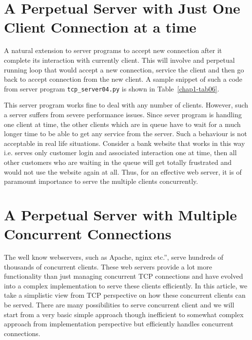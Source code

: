 \begin{multicols}{2}

\section{A Perpetual Server with Just One Client Connection at a time}

A natural extension to server programs to accept new connection after it complete its interaction with currently client. This will involve and perpetual running loop that would accept a new connection, service the client and then go back to accept connection from the new client. A sample snippet of such a code from server program \texttt{tcp\_server04.py} \cite{art1-key04} is shown in Table~\ref{chap1-tab06}. 


This server program works fine to deal with any number of clients. However, such a server suffers from severe performance issues. Since sever program is handling one client at time, the other clients which are in queue have to wait for a much longer time to be able to get any service from the server. Such a behaviour is not acceptable in real life situations. Consider a bank website that works in this way i.e. serves only customer login and associated interaction one at time, then all other customers who are waiting in the queue will get totally frustrated and would not use the website again at all. Thus, for an effective web server, it is of paramount importance to serve the multiple clients concurrently.

\section{A Perpetual Server with Multiple Concurrent Connections}

The well know webservers, such as Apache, nginx etc.”, serve hundreds of thousands of concurrent clients. These web servers provide a lot more functionality than just managing concurrent TCP connections and have evolved into a complex implementation to serve these clients efficiently. In this article, we take a simplistic view from TCP perspective on how these concurrent clients can be served. There are many possibilities to serve concurrent client and we will start from a very basic simple approach though inefficient to somewhat complex approach from implementation perspective but efficiently handles concurrent connections.


\end{multicols}
